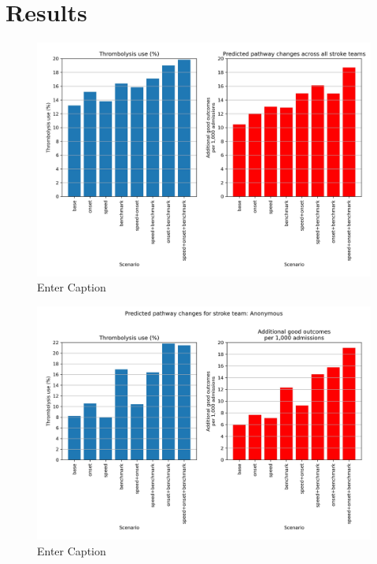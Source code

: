 \section{Results}


\begin{figure}
    \centering
    \includegraphics[width=1.0\linewidth]{images/sim_results_summary}
    \caption{Enter Caption}
    \label{fig:sim_results_summary}
\end{figure}

\begin{figure}
    \centering
    \includegraphics[width=1.0\linewidth]{images/sim_results_team_x}
    \caption{Enter Caption}
    \label{fig:sim_results_team_x}
\end{figure}

